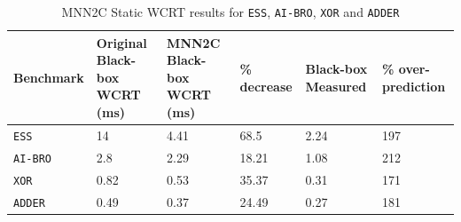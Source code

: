 \begin{table}[H]
	\centering
	\caption{MNN2C Static \ac{WCRT} results for \texttt{ESS}, \texttt{AI-BRO}, \texttt{XOR} and \texttt{ADDER}}
	\label{tbl:res-mnn2c}
	\begin{tabular}{|p{}|p{}|p{}|p{}|p{}|p{}|}
		\hline
		Benchmark         & Original Black-box WCRT (ms) & MNN2C Black-box WCRT (ms)  &  \% decrease & Black-box Measured & \% over-prediction \\ \hline
		\texttt{ESS}        & 14 & 4.41 & 68.5 & 2.24 & 197 \\  \hline
		\texttt{AI-BRO}        & 2.8 & 2.29 & 18.21 & 1.08 & 212 \\ \hline
		\texttt{XOR}        & 0.82 & 0.53 & 35.37 & 0.31 & 171 \\  \hline
		\texttt{ADDER}        & 0.49 & 0.37 & 24.49 & 0.27 & 181 \\ \hline
	\end{tabular}
\end{table}


